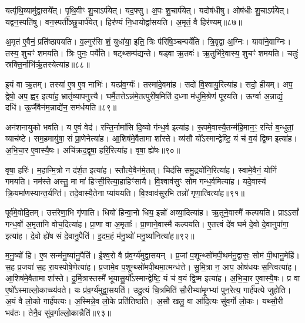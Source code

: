 यत्पृ॑थि॒व्यामु॑द्वा॒सये᳚त्। 
पृ॒थि॒वीꣳ शु॒चाऽर्प॑येत्। 
यद॒फ्सु। 
अ॒पः  शु॒चार्प॑येत्। 
यदोष॑धीषु। 
ओष॑धीः  शु॒चाऽर्प॑येत्। 
यद्वन॒स्पति॑षु। 
वन॒स्पती᳚ञ्छु॒चार्प॑येत्। 
हिर॑ण्यं नि॒धायोद्वा॑सयति। 
अ॒मृतं॒ वै हिर॑ण्यम्॥८७॥

अ॒मृत॑ ए॒वैनं॒ प्रति॑ष्ठापयति। 
व॒ल्गुर॑सि शं॒ युधा॑या॒ इति॒ त्रिः प॑रिषि॒ञ्चन्पर्ये॑ति। 
त्रि॒वृद्वा अ॒ग्निः। 
यावा॑ने॒वाग्निः। 
तस्य॒ शुचꣳ॑ शमयति। 
त्रिः पुनः॒ पर्ये॑ति। 
षट्थ्सम्प॑द्यन्ते। 
षड्वा ऋ॒तवः॑। 
ऋ॒तुभि॑रे॒वास्य॒ शुचꣳ॑ शमयति। 
चतुः॑ स्रक्ति॒र्नाभि॑र्\mbox{}ऋ॒तस्येत्या॑ह॥८८॥

इ॒यं वा ऋ॒तम्। 
तस्या॑ ए॒ष ए॒व नाभिः॑। 
यत्प्र॑व॒र्ग्यः॑। 
तस्मा॑दे॒वमा॑ह। 
सदो॑ वि॒श्वायु॒रित्या॑ह। 
सदो॒ हीयम्। 
अप॒ द्वेषो॒ अप॒ ह्वर॒ इत्या॑ह॒ भ्रातृ॑व्यापनुत्त्यै। 
घर्मै॒तत्तेऽन्न॑मे॒तत्पुरी॑ष॒मिति॑ द॒ध्ना म॑धुमि॒श्रेण॑ पूरयति। 
ऊर्ग्वा अ॒न्नाद्यं॒ दधि॑। 
ऊ॒र्जैवैन॑म॒न्नाद्ये॑न॒ सम॑र्धयति॥८९॥

अन॑शनायुको भवति। 
य ए॒वं वेद॑। 
रन्ति॒र्नामा॑सि दि॒व्यो ग॑न्ध॒र्व इत्या॑ह। 
रू॒पमे॒वास्यै॒तन्म॑हि॒मान॒ꣳ॒ रन्तिं॑ ब॒न्धुतां॒ व्याच॑ष्टे। 
सम॒हमायु॑षा॒ सं प्रा॒णेनेत्या॑ह। 
आ॒शिष॑मे॒वैतामा शा᳚स्ते। 
व्य॑सौ यो᳚ऽस्मान्द्वेष्टि॒ यं च॑ व॒यं द्वि॒ष्म इत्या॑ह। 
अ॒भि॒चा॒र ए॒वास्यै॒षः। 
अचि॑क्रद॒द्वृषा॒ हरि॒रित्या॑ह। 
वृषा॒ ह्ये॑षः॥९०॥

वृषा॒ हरिः॑। 
म॒हान्मि॒त्रो न द॑र्\mbox{}श॒त इत्या॑ह। 
स्तौत्ये॒वैन॑मे॒तत्। 
चिद॑सि समु॒द्रयो॑नि॒रित्या॑ह। 
स्वामे॒वैनं॒ योनिं॑ गमयति। 
नम॑स्ते अस्तु॒ मा मा॑ हिꣳसी॒रित्या॒हाहिꣳ॑सायै। 
वि॒श्वाव॑सुꣳ सोम गन्ध॒र्वमित्या॑ह। 
यदे॒वास्य॑ क्रि॒यमा॑ण\-स्यान्त॒र्यन्ति॑। 
तदे॒वास्यै॒तेना प्या॑ययति। 
वि॒श्वाव॑सुर॒भि तन्नो॑ गृणा॒त्वि\-त्या॑ह॥९१॥

पूर्व॑मे॒वोदि॒तम्। 
उत्त॑रेणा॒भि गृ॑णाति। 
धियो॑ हिन्वा॒नो धिय॒ इन्नो॑ अव्या॒दित्या॑ह। 
ऋ॒तूने॒वास्मै॑ कल्पयति। 
प्राऽऽसां᳚ गन्ध॒र्वो अ॒मृता॑नि वोच॒दित्या॑ह। 
प्रा॒णा वा अ॒मृताः᳚। 
प्रा॒णाने॒वास्मै॑ कल्पयति। 
ए॒तत्त्वं दे॑व घर्म दे॒वो दे॒वानुपा॑गा॒ इत्या॑ह। 
दे॒वो ह्ये॑ष सं दे॒वानु॒पैति॑। 
इ॒दम॒हं म॑नु॒ष्यो॑ मनु॒ष्या॑नित्या॑ह॥९२॥

म॒नु॒ष्यो॑ हि। 
ए॒ष सन्म॑नु॒ष्या॑नु॒पैति॑। 
ई॒श्व॒रो वै प्र॑व॒र्ग्य॑मुद्वा॒सयन्। 
प्र॒जां प॒शून्थ्सो॑मपी॒थम॑नू॒द्वासः॒ सोम॑ पी॒थानु॒मेहि॑। 
स॒ह प्र॒जया॑ स॒ह रा॒यस्पोषे॒णेत्या॑ह। 
प्र॒जामे॒व प॒शून्थ्सो॑मपी॒थमा॒त्मन्ध॑त्ते। 
सु॒मि॒त्रा न॒ आप॒ ओष॑धयः स॒न्त्वित्या॑ह। 
आ॒शिष॑मे॒वैतामा शा᳚स्ते। 
दु॒र्मि॒त्रास्तस्मै॑ भूयासु॒र्यो᳚ऽस्मान्द्वेष्टि॒ यं च॑ व॒यं द्वि॒ष्म इत्या॑ह। 
अ॒भि॒चा॒र ए॒वास्यै॒षः। 
प्र वा ए॒षो᳚ऽस्माल्लो॒काच्च्य॑वते। 
यः प्र॑व॒र्ग्य॑मुद्वा॒सयति॑। 
उदु॒त्यं चि॒त्रमिति॑ सौ॒रीभ्या॑मृ॒ग्भ्यां पुन॒रेत्य॒ गार्\mbox{}ह॑पत्ये जुहोति। 
अ॒यं वै लो॒को गार्\mbox{}ह॑पत्यः। 
अ॒स्मिन्ने॒व लो॒के प्रति॑तिष्ठति। 
अ॒सौ खलु॒ वा आ॑दि॒त्यः सु॑व॒र्गो लो॒कः। 
यथ्सौ॒री भव॑तः। 
तेनै॒व सु॑व॒र्गाल्लो॒कान्नैति॑॥९३॥
\anuvakamend[ब्रह्म॑णस्त्वा पर॒स्पाया॒ इत्या॑ह दधात्य॒न्वित्य॑ रक्ष॒स्वी रक्ष॑सा॒मप॑हत्यै॒ वै हिर॑ण्यमाहार्धयति॒ ह्ये॑ष गृ॑णा॒त्वित्या॑ह मनु॒ष्या॑नित्या॑हास्यै॒षो᳚ऽष्टौ च॑]

